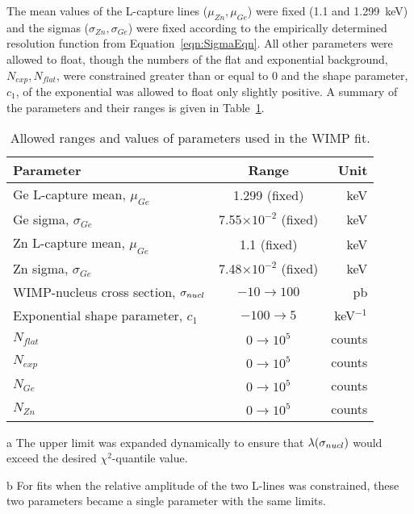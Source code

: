 The mean values of the L-capture lines ($\mu_{Zn}, \mu_{Ge}$) were fixed (1.1 and 1.299~keV) and the sigmas ($\sigma_{Zn}, \sigma_{Ge}$) were fixed according to the empirically determined resolution function from Equation~\ref{eqn:SigmaEqn}.  All other parameters were allowed to float, though the numbers of the flat and exponential background, $N_{exp}, N_{flat}$, were constrained greater than or equal to 0 and the shape parameter, $c_{1}$, of the exponential was allowed to float only slightly positive.  A summary of the parameters and their ranges is given in Table~\ref{tab:WIMPFitParameterRanges}. 
		\begin{table}
			\centering				
			\caption{Allowed ranges and values of parameters used in the WIMP fit.}
			\label{tab:WIMPFitParameterRanges}
			\smallskip
			\begin{threeparttable}
				\begin{tabular}{lcr}
				Parameter & Range & Unit \\
				\hline
				Ge L-capture mean, $\mu_{Ge}$ & 1.299 (fixed) & keV \\
				Ge sigma, $\sigma_{Ge}$ & 7.55$\times10^{-2}$ (fixed) & keV \\				
				Zn L-capture mean, $\mu_{Ge}$ & 1.1 (fixed) & keV \\
				Zn sigma, $\sigma_{Ge}$ & 7.48$\times10^{-2}$ (fixed) & keV \\
				WIMP-nucleus cross section, $\sigma_{nucl}$ & $-10\to100$\tnote{a} & pb \\
				Exponential shape parameter, $c_{1}$ & $-100\to5$ & keV$^{-1}$ \\				
				$N_{flat}$ & $0\to10^{5}$ & counts \\			
				$N_{exp}$ & $0\to10^{5}$ & counts \\	
				$N_{Ge}$\tnote{b} & $0\to10^{5}$ & counts \\			
				$N_{Zn}$\tnote{b} & $0\to10^{5}$ & counts \\						
				\hline							
				\end{tabular}		
				 \begin{tablenotes}
				       \item[a] {The upper limit was expanded dynamically to ensure that $\lambda(\sigma_{nucl})$ would exceed
				       the desired $\chi^{2}$-quantile value.}
				       \item[b] { For fits when the relative amplitude of the two L-lines was constrained, these two 
				       parameters became a single parameter with the same limits.}
			     	\end{tablenotes}
			\end{threeparttable}
		\end{table}
